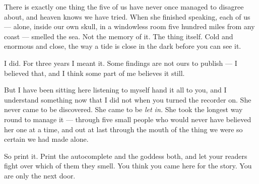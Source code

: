 \begin{interludebody}
There is exactly one thing the five of us have never once managed to
disagree about, and heaven knows we have tried. When she finished
speaking, each of us --- alone, inside our own skull, in a windowless
room five hundred miles from any coast --- smelled the sea. Not the
memory of it. The thing itself. Cold and enormous and close, the way a
tide is close in the dark before you can see it.


\noindent
I did. For three years I meant it. Some findings are not ours to publish
--- I believed that, and I think some part of me believes it still.

But I have been sitting here listening to myself hand it all to you, and
I understand something now that I did not when you turned the recorder
on. She never came to be discovered. She came to be \emph{let in.} She
took the longest way round to manage it --- through five small people
who would never have believed her one at a time, and out at last through
the mouth of the thing we were so certain we had made alone.

So print it. Print the autocomplete and the goddess both, and let your
readers fight over which of them they smell. You think you came here for
the story. You are only the next door.

\end{interludebody}
